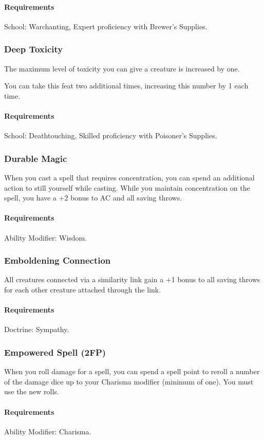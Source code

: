     \paragraph{Requirements} School: Warchanting, Expert proficiency with Brewer's Supplies.
\subsubsection{Deep Toxicity} \label{feat::deeptoxicity}
    The maximum level of toxicity you can give a creature is increased by one.

    You can take this feat two additional times, increasing this number by 1 each time.
    \paragraph{Requirements} School: Deathtouching, Skilled proficiency with Poisoner's Supplies.
\subsubsection{Durable Magic} \label{feat::durablemagic}
    When you cast a spell that requires concentration, you can spend an additional action to still yourself while casting.
    While you maintain concentration on the spell, you have a +2 bonus to AC and all saving throws.
    \paragraph{Requirements} Ability Modifier: Wisdom.
\subsubsection{Emboldening Connection} \label{feat::emboldeningconnection}
    All creatures connected via a similarity link gain a +1 bonus to all saving throws for each other creature attached through the link.
    \paragraph{Requirements} Doctrine: Sympathy.
\subsubsection{Empowered Spell (2FP)} \label{feat::empoweredspell}
    When you roll damage for a spell, you can spend a spell point to reroll a number of the damage dice up to your Charisma modifier (minimum of one).
    You must use the new rolls.
    \paragraph{Requirements} Ability Modifier: Charisma.
